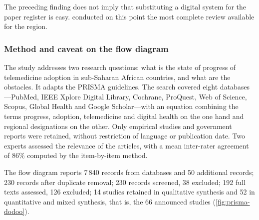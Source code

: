 \documentclass[12pt,a4paper,oneside]{report}
\begin{document}
The preceding finding does not imply that substituting a digital system for the paper register is easy. \textcite{dodoo2022} conducted on this point the most complete review available for the region.

\subsubsection{Method and caveat on the flow diagram}

The study addresses two research questions: what is the state of progress of telemedicine adoption in sub-Saharan African countries, and what are the obstacles. It adapts the PRISMA guidelines. The search covered eight databases---PubMed, IEEE Xplore Digital Library, Cochrane, ProQuest, Web of Science, Scopus, Global Health and Google Scholar---with an equation combining the terms progress, adoption, telemedicine and digital health on the one hand and regional designations on the other. Only empirical studies and government reports were retained, without restriction of language or publication date. Two experts assessed the relevance of the articles, with a mean inter-rater agreement of 86\% computed by the item-by-item method.

The flow diagram reports 7\,840 records from databases and 50 additional records; 230 records after duplicate removal; 230 records screened, 38 excluded; 192 full texts assessed, 126 excluded; 14 studies retained in qualitative synthesis and 52 in quantitative and mixed synthesis, that is, the 66 announced studies (\cref{fig:prisma-dodoo}).
\end{document}

